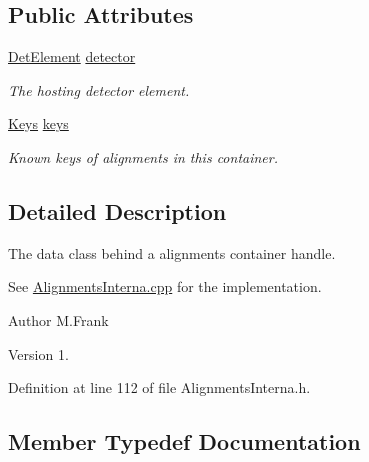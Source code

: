 \subsection*{Public Attributes}
\begin{DoxyCompactItemize}
\item 
\hyperlink{class_d_d4hep_1_1_geometry_1_1_det_element}{Det\+Element} \hyperlink{class_d_d4hep_1_1_alignments_1_1_interna_1_1_alignment_container_a21939f73d4dae58da536ec3f3480e7d3}{detector}
\begin{DoxyCompactList}\small\item\em The hosting detector element. \end{DoxyCompactList}\item 
\hyperlink{class_d_d4hep_1_1_alignments_1_1_interna_1_1_alignment_container_a3fc62784c22ba44d9ac63c424ec55799}{Keys} \hyperlink{class_d_d4hep_1_1_alignments_1_1_interna_1_1_alignment_container_adb4a3abb58c149338ecc2d08e2c0aec9}{keys}
\begin{DoxyCompactList}\small\item\em Known keys of alignments in this container. \end{DoxyCompactList}\end{DoxyCompactItemize}


\subsection{Detailed Description}
The data class behind a alignments container handle. 

See \hyperlink{_alignments_interna_8cpp}{Alignments\+Interna.\+cpp} for the implementation.

\begin{DoxyAuthor}{Author}
M.\+Frank 
\end{DoxyAuthor}
\begin{DoxyVersion}{Version}
1. 
\end{DoxyVersion}


Definition at line 112 of file Alignments\+Interna.\+h.



\subsection{Member Typedef Documentation}
\hypertarget{class_d_d4hep_1_1_alignments_1_1_interna_1_1_alignment_container_a99b2a8d269ecefcf1b59269ad94e75e3}{}\label{class_d_d4hep_1_1_alignments_1_1_interna_1_1_alignment_container_a99b2a8d269ecefcf1b59269ad94e75e3} 
